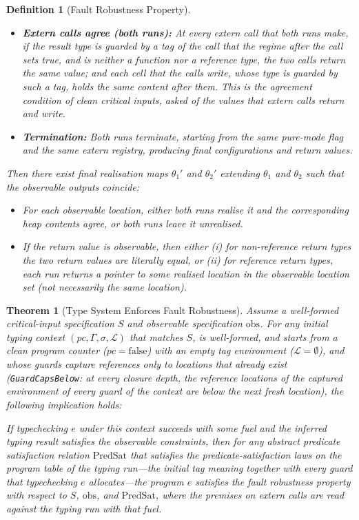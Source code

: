 \documentclass[12pt]{article}
\newtheorem{theorem}{Theorem}[section]
\newtheorem{definition}{Definition}[section]
\begin{document}
\begin{definition}[Fault Robustness Property]
\begin{itemize}
    \item \textbf{Extern calls agree (both runs):} At every extern call that both runs make, if the result type is guarded by a tag of the call that the regime after the call sets true, and is neither a function nor a reference type, the two calls return the same value; and each cell that the calls write, whose type is guarded by such a tag, holds the same content after them. This is the agreement condition of clean critical inputs, asked of the values that extern calls return and write.
    \item \textbf{Termination:} Both runs terminate, starting from the same pure-mode flag and the same extern registry, producing final configurations and return values.
\end{itemize}
Then there exist final realisation maps $\theta_1'$ and $\theta_2'$ extending $\theta_1$ and $\theta_2$ such that the observable outputs coincide:
\begin{itemize}
    \item For each observable location, either both runs realise it and the corresponding heap contents agree, or both runs leave it unrealised.
    \item If the return value is observable, then either (i) for non-reference return types the two return values are literally equal, or (ii) for reference return types, each run returns a pointer to some realised location in the observable location set (not necessarily the same location).
\end{itemize}
\end{definition}

\begin{theorem}[Type System Enforces Fault Robustness]

Assume a well-formed critical-input specification $S$ and observable
specification $\text{obs}$. For any initial typing context
$(pc,\Gamma,\sigma,\mathcal{L})$ that matches $S$, is well-formed, and starts
from a clean program counter ($pc = \text{false}$) with an empty tag environment
($\mathcal{L} = \emptyset$), and whose guards capture references only to
locations that already exist (\texttt{GuardCapsBelow}: at every closure depth,
the reference locations of the captured environment of every guard of the
context are below the next fresh location), the following implication holds:

If typechecking $e$ under this context succeeds with some fuel and the inferred typing result satisfies the
observable constraints, then for \emph{any} abstract predicate satisfaction relation
$\text{PredSat}$ that satisfies the predicate-satisfaction laws on the
\emph{program table} of the typing run---the initial tag meaning together with
every guard that typechecking $e$ allocates---the program $e$ satisfies the
fault robustness property with respect to $S$, $\text{obs}$, and
$\text{PredSat}$, where the premises on extern calls are read against the
typing run with that fuel.
\end{theorem}
\end{document}

